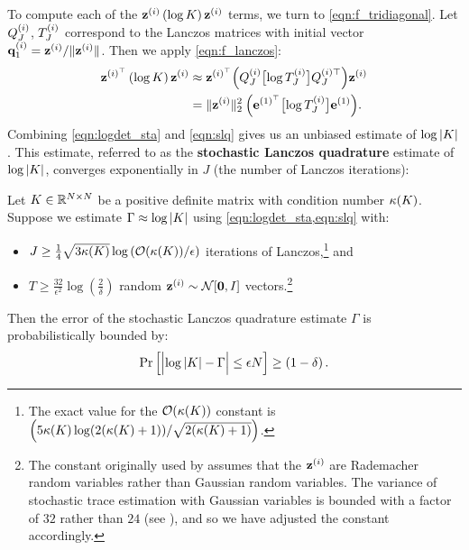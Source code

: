 To compute each of the $\mathbf{z}^{(i)} \left( \log K \right) \mathbf{z}^{(i)}$ terms, we turn to \cref{eqn:f_tridiagonal}.
Let $Q_J^{(i)}$, $T_J^{(i)}$ correspond to the Lanczos matrices with initial vector $\mathbf{q}^{(i)}_1 = \mathbf{z}^{(i)} / \Vert \mathbf{z}^{(i)} \Vert$.
Then we apply \cref{eqn:f_lanczos}:
%
\begin{align}
  \mathbf{z}^{(i)^\top} \left( \log K \right) \mathbf{z}^{(i)}
  &\approx \mathbf{z}^{(i)^\top} \Bigl( Q^{(i)}_J \bigl[ \log T^{(i)}_J \bigr] Q^{(i)\top}_J \Bigr) \mathbf{z}^{(i)}
  \nonumber
  \\
  &= \Vert \mathbf{z}^{(i)} \Vert^2_2 \: \Bigl( \mathbf{e}^{(1)^\top} \bigl[ \log T^{(i)}_J \bigr] \mathbf{e}^{(1)} \Bigr).
  \label{eqn:slq}
\end{align}
%
Combining \cref{eqn:logdet_sta} and \cref{eqn:slq} gives us an unbiased estimate of $\log \vert K \vert$.
This estimate, referred to as the {\bf stochastic Lanczos quadrature} estimate of $\log \vert K \vert$, converges exponentially in $J$ (the number of Lanczos iterations):
%
\begin{theorem}
  \label{thm:slq_convergence}
  Let $K \in \mathbb{R}^{N \times N}$ be a positive definite matrix with condition number $\kappa( K )$.
	Suppose we estimate $\Gamma \approx \log \vert K \vert$ using \cref{eqn:logdet_sta,eqn:slq} with:
	\begin{itemize}
		\item $J \geq \frac{1}{4} \sqrt{ 3 \kappa(\bK) } \log \left( \bigo{\kappa(\bK)} / \epsilon \right)$ iterations of Lanczos,\footnote{
			The exact value for the $\bigo{\kappa(\bK)}$ constant is $\left( 5 \kappa(K) \log ( 2 (\kappa(K) + 1)) / \sqrt{ 2(\kappa(K) + 1) } \right)$.
		} and
		\item $T \geq \frac{32}{\epsilon^2} \log \left( \frac 2 \delta \right)$ random $\bz^{(i)} \sim \normaldist{\bzero}{\bI}$ vectors.\footnote{
			The constant originally used by \citet{ubaru2017fast} assumes that the $\mathbf{z}^{(i)}$ are Rademacher random variables rather than Gaussian random variables.
			The variance of stochastic trace estimation with Gaussian variables is bounded with a factor of $32$ rather than $24$ (see \citep[][Eqs. 4 and 5]{roosta2015improved}), and so we have adjusted the constant accordingly.
		}
	\end{itemize}
  Then the error of the stochastic Lanczos quadrature estimate $\Gamma$ is probabilistically bounded by:
  \begin{equation*}
    \textrm{Pr}\left[\Bigl\vert \log \vert K \vert - \Gamma \Bigr\vert \leq \epsilon N \right] \geq \left( 1 - \delta \right).
  \end{equation*}
\end{theorem}

